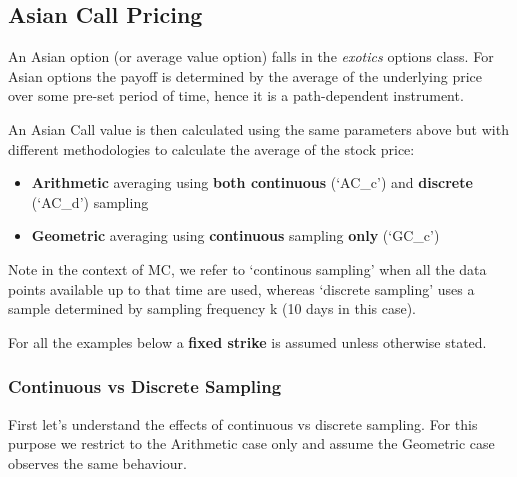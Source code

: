 \documentclass{article}
\providecommand{\tightlist}{%
      \setlength{\itemsep}{0pt}\setlength{\parskip}{0pt}}
\begin{document}
        
    \begin{center}
    \end{center}

    
    \subsection{Asian Call Pricing}\label{asian-call-pricing}

An Asian option (or average value option) falls in the {\it{exotics}} options class. For Asian options the payoff is determined by the average of the underlying price over some pre-set period of time, hence it is a path-dependent instrument.

An Asian Call value is then calculated using the same parameters above
but with different methodologies to calculate the average of the stock
price:

\begin{itemize}
\tightlist
\item
  \textbf{Arithmetic} averaging using \textbf{both continuous} (`AC\_c')
  and \textbf{discrete} (`AC\_d') sampling
\item
  \textbf{Geometric} averaging using \textbf{continuous} sampling
  \textbf{only} (`GC\_c')
\end{itemize}

Note in the context of MC, we refer to `continous sampling' when all the
data points available up to that time are used, whereas `discrete
sampling' uses a sample determined by sampling frequency k (10 days in
this case).

For all the examples below a \textbf{fixed strike} is assumed unless otherwise stated.

    \subsubsection{Continuous vs Discrete
Sampling}\label{continuous-vs-discrete-sampling}

First let's understand the effects of continuous vs discrete sampling.
For this purpose we restrict to the Arithmetic case only and assume the
Geometric case observes the same behaviour.
\end{document}
